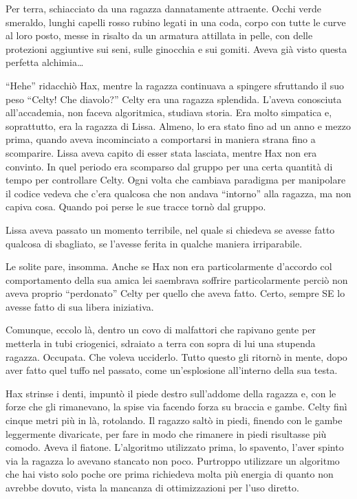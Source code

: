     Per terra, schiacciato da una ragazza dannatamente attraente. Occhi
    verde smeraldo, lunghi capelli rosso rubino legati in una coda, corpo
    con tutte le curve al loro posto, messe in risalto da un armatura
    attillata in pelle, con delle protezioni aggiuntive sui seni, sulle
    ginocchia e sui gomiti. Aveva già visto questa perfetta
    alchimia\dots{}

    ``Hehe'' ridacchiò Hax, mentre la ragazza continuava a spingere sfruttando
    il suo peso ``Celty! Che diavolo?'' Celty era una ragazza splendida.
    L'aveva conosciuta all'accademia, non faceva algoritmica, studiava
    storia. Era molto simpatica e, soprattutto, era la ragazza di Lissa.
    Almeno, lo era stato fino ad un anno e mezzo prima, quando aveva
    incominciato a comportarsi in maniera strana fino a scomparire. Lissa
    aveva capito di esser stata lasciata, mentre Hax non era convinto. In
    quel periodo era scomparso dal gruppo per una certa quantità di tempo
    per controllare Celty. Ogni volta che cambiava paradigma per manipolare
    il codice vedeva che c'era qualcosa che non andava ``intorno'' alla
    ragazza, ma non capiva cosa. Quando poi perse le sue tracce tornò dal
    gruppo.

    Lissa aveva passato un momento terribile, nel quale si chiedeva se
    avesse fatto qualcosa di sbagliato, se l'avesse ferita in qualche
    maniera irriparabile.

    Le solite pare, insomma. Anche se Hax non era particolarmente d'accordo
    col comportamento della sua amica lei saembrava soffrire
    particolarmente perciò non aveva proprio ``perdonato'' Celty per quello
    che aveva fatto. Certo, sempre SE lo avesse fatto di sua libera
    iniziativa.

    Comunque, eccolo là, dentro un covo di malfattori che rapivano gente
    per metterla in tubi criogenici, sdraiato a terra con sopra di lui una
    stupenda ragazza. Occupata. Che voleva ucciderlo. Tutto questo gli
    ritornò in mente, dopo aver fatto quel tuffo nel passato, come
    un'esplosione all'interno della sua testa.

    Hax strinse i denti, impuntò il piede destro sull'addome della ragazza
    e, con le forze che gli rimanevano, la spise via facendo forza su
    braccia e gambe. Celty finì cinque metri più in là, rotolando. Il
    ragazzo saltò in piedi, finendo con le gambe leggermente divaricate,
    per fare in modo che rimanere in piedi risultasse più comodo. Aveva il
    fiatone. L'algoritmo utilizzato prima, lo spavento, l'aver spinto via
    la ragazza lo avevano stancato non poco. Purtroppo utilizzare un
    algoritmo che hai visto solo poche ore prima richiedeva molta più
    energia di quanto non avrebbe dovuto, vista la mancanza di
    ottimizzazioni per l'uso diretto.

